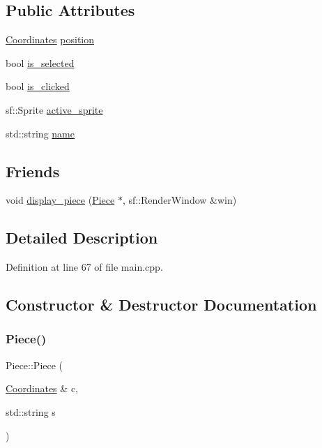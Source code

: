 \subsection*{Public Attributes}
\begin{DoxyCompactItemize}
\item 
\mbox{\hyperlink{class_coordinates}{Coordinates}} \mbox{\hyperlink{class_piece_a3a789618e64cb8139a2bc79f44bb6edb}{position}}
\item 
bool \mbox{\hyperlink{class_piece_a21b7b54849acd46163b4b6281b5b0e57}{is\+\_\+selected}}
\item 
bool \mbox{\hyperlink{class_piece_ab2ba8aa3a4471ff1a5400fe0617657cb}{is\+\_\+clicked}}
\item 
sf\+::\+Sprite \mbox{\hyperlink{class_piece_a65fa621a87983d21756c2d2d63e8189b}{active\+\_\+sprite}}
\item 
std\+::string \mbox{\hyperlink{class_piece_aceb5b0dda6aa7ac881abe103bb98ac7e}{name}}
\end{DoxyCompactItemize}
\subsection*{Friends}
\begin{DoxyCompactItemize}
\item 
void \mbox{\hyperlink{class_piece_ae756348a210f32b7eda542c76a5d666e}{display\+\_\+piece}} (\mbox{\hyperlink{class_piece}{Piece}} $\ast$, sf\+::\+Render\+Window \&win)
\end{DoxyCompactItemize}


\subsection{Detailed Description}


Definition at line 67 of file main.\+cpp.



\subsection{Constructor \& Destructor Documentation}
\mbox{\label{class_piece_a9ef73da286fed76e9cfe158bda2cf565}} 
\subsubsection{\texorpdfstring{Piece()}{Piece()}}
{\footnotesize\ttfamily Piece\+::\+Piece (\begin{DoxyParamCaption}\item[{\mbox{\hyperlink{class_coordinates}{Coordinates}} \&}]{c,  }\item[{std\+::string}]{s }\end{DoxyParamCaption})\hspace{0.3cm}{\ttfamily [inline]}}



